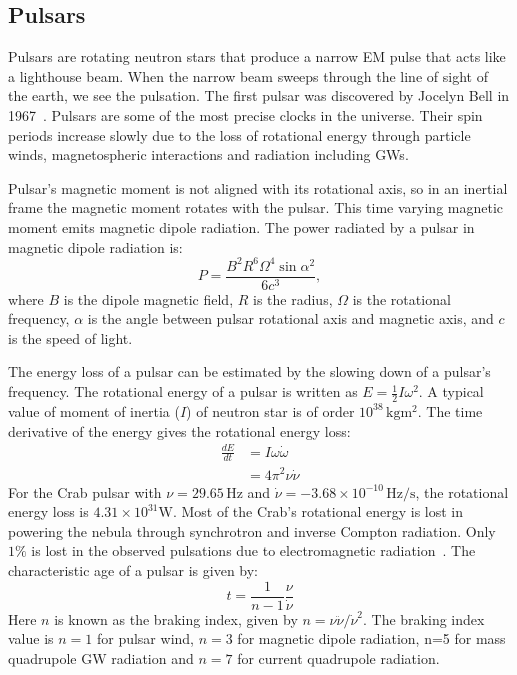 \documentclass{ttuthes2007}
\begin{document}
\subsection{Pulsars}
Pulsars are rotating neutron stars that produce a narrow \ac{EM} pulse that
acts like a lighthouse beam. When the narrow beam sweeps through the line of sight of
the earth, we see the pulsation. The first pulsar was discovered by Jocelyn Bell
in 1967~\cite{1968Natur.217..709H}. Pulsars are some of the most precise clocks in the
universe. Their spin periods increase slowly due to the loss of rotational
energy through particle winds, magnetospheric interactions and radiation
including \acp{GW}.

Pulsar's magnetic moment is not aligned with its rotational axis, so in an
inertial frame
the magnetic moment rotates with the pulsar. This time varying magnetic
moment emits magnetic dipole radiation. The power radiated by
a pulsar in magnetic dipole radiation is:
\begin{equation}
P= \frac{B^2R^6\Omega^4\sin{\alpha}^2}{6c^3},
\end{equation}
where $B$ is the dipole magnetic field, $R$ is the radius, $\Omega$ is the rotational
frequency, $\alpha$ is the angle between pulsar rotational axis and magnetic axis,
and $c$ is the speed of light.  

The energy loss of a pulsar can be estimated by the slowing down of a pulsar's
frequency. The rotational energy of a pulsar is written as $E=\frac{1}{2} I
\omega^2$. A
typical value of moment of inertia ($I$) of neutron star is of order
$10^{38}$\,$\mathrm{kg m^2}$. The
time derivative of the energy gives the rotational energy loss:
\begin{align}
\frac{dE}{dt} &= I\omega\dot{\omega}\\
&= 4\pi^2\nu\dot{\nu}
\end{align}
For the Crab pulsar with $\nu=29.65\,\mathrm{Hz}$ and $\dot{\nu}=
-3.68\times10^{-10}\,\mathrm{Hz/s}$, the rotational energy loss is
$4.31\times10^{31}\mathrm{W}$. Most of the Crab's rotational energy is lost in
powering the nebula through synchrotron and inverse Compton radiation.  Only
$1\%$ is lost in the observed pulsations due to electromagnetic
radiation~\cite{B_hler_2014}.
The characteristic age of a pulsar is given by:
\begin{equation}
t= \frac{1}{n-1}\frac{\nu}{\dot{\nu}}
\end{equation} 
Here $n$ is known as the braking index, given by $n=\nu\ddot{\nu}/\dot{\nu}^2$. 
The braking index value is $n=1$ for pulsar wind, $n=3$ for magnetic dipole
radiation, n=5 for mass quadrupole \ac{GW} radiation and $n=7$ for current
quadrupole radiation.
\end{document}
